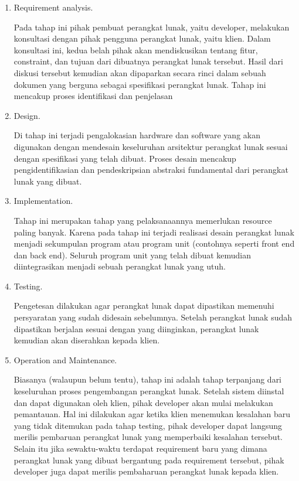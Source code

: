 \documentclass[12pt]{article}
\begin{document}
\begin{enumerate}[label=\textbf{3.\arabic*}]
    \begin{enumerate}[label=\arabic*.]
        \item Requirement analysis. 
        
        Pada tahap ini pihak pembuat perangkat lunak, yaitu developer, melakukan konsultasi dengan pihak pengguna perangkat lunak, yaitu klien. Dalam konsultasi ini, kedua belah pihak akan mendiskusikan tentang fitur, constraint, dan tujuan dari dibuatnya perangkat lunak tersebut. Hasil dari diskusi tersebut kemudian akan dipaparkan secara rinci dalam sebuah dokumen yang  berguna sebagai spesifikasi perangkat lunak. Tahap ini mencakup proses identifikasi dan penjelasan

        \item Design. 
        
        Di tahap ini terjadi pengalokasian hardware dan software yang akan digunakan dengan mendesain keseluruhan arsitektur perangkat lunak sesuai dengan spesifikasi yang telah dibuat. Proses desain mencakup pengidentifikasian dan pendeskripsian abstraksi fundamental dari perangkat lunak yang dibuat.
        
        \item Implementation. 
        
        Tahap ini merupakan tahap yang pelaksanaannya memerlukan resource paling banyak. Karena pada tahap ini terjadi realisasi desain perangkat lunak menjadi sekumpulan program atau program unit (contohnya seperti front end dan back end). Seluruh program unit yang telah dibuat kemudian diintegrasikan menjadi sebuah perangkat lunak yang utuh.
        
        \item Testing. 
        
        Pengetesan dilakukan agar perangkat lunak dapat dipastikan memenuhi persyaratan yang sudah didesain sebelumnya. Setelah perangkat lunak sudah dipastikan berjalan sesuai dengan yang diinginkan, perangkat lunak kemudian akan diserahkan kepada klien.

        \item Operation and Maintenance. 
        
        Biasanya (walaupun belum tentu), tahap ini adalah tahap terpanjang dari keseluruhan proses pengembangan perangkat lunak. Setelah sistem diinstal dan dapat digunakan oleh klien, pihak developer akan mulai melakukan pemantauan. Hal ini dilakukan agar ketika klien menemukan kesalahan baru yang tidak ditemukan pada tahap testing, pihak developer dapat langsung merilis pembaruan perangkat lunak yang memperbaiki kesalahan tersebut. Selain itu jika sewaktu-waktu terdapat requirement baru yang dimana perangkat lunak yang dibuat bergantung pada requirement tersebut, pihak developer juga dapat merilis pembaharuan perangkat lunak kepada klien.


\end{enumerate}
\end{enumerate}
\end{document}
